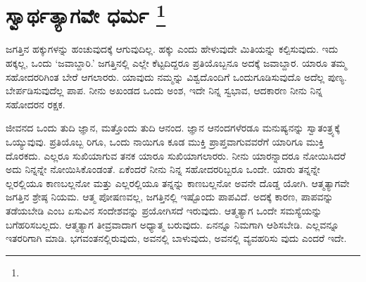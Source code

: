 
\chapter[ಸ್ವಾರ್ಥತ್ಯಾಗವೇ ಧರ್ಮ ]{ಸ್ವಾರ್ಥತ್ಯಾಗವೇ ಧರ್ಮ \protect\footnote{}}

ಜಗತ್ತಿನ ಹಕ್ಕುಗಳನ್ನು ಹಂಚುವುದಕ್ಕೆ ಆಗುವುದಿಲ್ಲ. ಹಕ್ಕು ಎಂದು ಹೇಳುವುದೇ ಮಿತಿಯನ್ನು ಕಲ್ಪಿಸುವುದು. ಇದು ಹಕ್ಕಲ್ಲ, ಒಂದು ‘ಜವಾಬ್ದಾರಿ.’ ಜಗತ್ತಿನಲ್ಲಿ ಎಲ್ಲೇ ಕೆಟ್ಟದಿದ್ದರೂ ಪ್ರತಿಯೊಬ್ಬನೂ ಅದಕ್ಕೆ ಜವಾಬ್ದಾರ. ಯಾರೂ ತಮ್ಮ ಸಹೋದರರಿಗಿಂತ ಬೇರೆ ಆಗಲಾರರು. ಯಾವುದು ನಮ್ಮನ್ನು ವಿಶ್ವದೊಂದಿಗೆ ಒಂದುಗೂಡಿಸುವುದೊ ಅದೆಲ್ಲ ಪುಣ್ಯ. ಬೇರ್ಪಡಿಸುವುದೆಲ್ಲ ಪಾಪ. ನೀನು ಅಖಂಡದ ಒಂದು ಅಂಶ, ಇದೇ ನಿನ್ನ ಸ್ವಭಾವ, ಆದಕಾರಣ ನೀನು ನಿನ್ನ ಸಹೋದರನ ರಕ್ಷಕ.

ಜೀವನದ ಒಂದು ತುದಿ ಜ್ಞಾನ, ಮತ್ತೊಂದು ತುದಿ ಆನಂದ. ಜ್ಞಾನ ಆನಂದಗಳೆರಡೂ ಮನುಷ್ಯನನ್ನು ಸ್ವಾತಂತ್ರ್ಯಕ್ಕೆ ಒಯ್ಯುವುವು. ಪ್ರತಿಯೊಬ್ಬ ರಿಗೂ, ಒಂದು ನಾಯಿಗೂ ಕೂಡ ಮುಕ್ತಿ ಪ್ರಾಪ್ತವಾಗುವವರೆಗೆ ಯಾರಿಗೂ ಮುಕ್ತಿ ದೊರಕದು. ಎಲ್ಲರೂ ಸುಖಿಯಾಗುವ ತನಕ ಯಾರೂ ಸುಖಿಯಾಗಲಾರರು. ನೀನು ಯಾರನ್ನಾದರೂ ನೋಯಿಸಿದರೆ ಅದು ನಿನ್ನನ್ನೇ ನೋಯಿಸಿಕೊಂಡಂತೆ. ಏಕೆಂದರೆ ನೀನು ನಿನ್ನ ಸಹೋದರರಿಬ್ಬರೂ ಒಂದೇ. ಯಾರು ತನ್ನನ್ನೇ ಲ್ಲರಲ್ಲಿಯೂ ಕಾಣಬಲ್ಲನೋ ಮತ್ತು ಎಲ್ಲರಲ್ಲಿಯೂ ತನ್ನನ್ನು ಕಾಣಬಲ್ಲನೋ ಅವನೇ ದೊಡ್ಡ ಯೋಗಿ. ಆತ್ಮತ್ಯಾಗವೇ ಜಗತ್ತಿನ ಶ್ರೇಷ್ಠ ನಿಯಮ. ಆತ್ಮ ಪೋಷಣವಲ್ಲ, ಜಗತ್ತಿನಲ್ಲಿ ಇಷ್ಟೊಂದು ಪಾಪವಿದೆ. ಅದಕ್ಕೆ ಕಾರಣ, ಪಾಪವನ್ನು ತಡೆಯಬೇಡಿ ಎಂಬ ಏಸುವಿನ ಸಂದೇಶವನ್ನು ಪ್ರಯೋಗಿಸದೆ ಇರುವುದು. ಆತ್ಮತ್ಯಾಗ ಒಂದೇ ಸಮಸ್ಯೆಯನ್ನು ಬಗೆಹರಿಸಬಲ್ಲದು. ಆತ್ಮತ್ಯಾಗ ತೀವ್ರವಾದಾಗ ಅಧ್ಯಾತ್ಮ ಬರುವುದು. ಏನನ್ನೂ ನಿಮಗಾಗಿ ಆಶಿಸಬೇಡಿ. ಎಲ್ಲವನ್ನೂ ಇತರರಿಗಾಗಿ ಮಾಡಿ. ಭಗವಂತನಲ್ಲಿರುವುದು, ಅವನಲ್ಲಿ ಬಾಳುವುದು, ಅವನಲ್ಲಿ ವ್ಯವಹರಿಸು ವುದು ಎಂದರೆ ಇದೇ.

